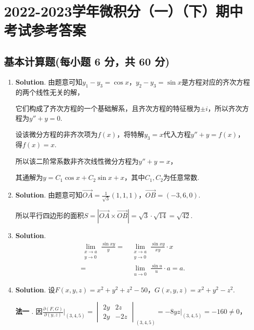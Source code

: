 \documentclass[../main.tex]{subfiles}
\begin{document}
\chapter{2022-2023学年微积分（一）（下）期中考试参考答案}
\section{基本计算题(每小题 6 分，共 60 分)}
\begin{enumerate}
    \item \textbf{Solution}. 由题意可知$y_{1}-y_{3}=\cos x$，$y_{2}-y_{3}=\sin x$是方程对应的齐次方程的两个线性无关的解，

          它们构成了齐次方程的一个基础解系，且齐次方程的特征根为$\pm i$，所以齐次方程为$y
              ''+y=0$.

          设该微分方程的非齐次项为$f(x)$，将特解$y_{3} = x$代入方程$y''+y=f(x)$，得$f
              (x)=x$.

          所以该二阶常系数非齐次线性微分方程为$y''+y=x$，

          其通解为$y = C_{1}\cos x + C_{2}\sin x + x$，其中$C_{1},C_{2}$为任意常数.

    \item \textbf{Solution}. 由题意可知$\overrightarrow{OA}=\frac{1}{\sqrt{3}}(1,
              1,1)$，$\overrightarrow{OB}=(-3,6,0)$.

          所以平行四边形的面积$S=\left|\overrightarrow{OA}\times \overrightarrow{OB}\right
              |=\sqrt{3}\cdot\sqrt{14}=\sqrt{42}$.

    \item \textbf{Solution}.
          \[
              \begin{aligned}
                  \lim_{\substack{x\to a \\ y\to 0}}\frac{\sin xy}{y}= {} & \lim_{\substack{x\to a \\ y\to 0}}\frac{\sin xy}{xy}\cdot x \\
                  = {}                                                    & \lim_{\substack{u\to 0}}\frac{\sin u}{u}\cdot a = a.
              \end{aligned}
          \]

    \item \textbf{Solution}. 设$F(x,y,z) = x^{2}+y^{2}+z^{2}-50$，$G(x,y,z)=x^{2}
              +y^{2}-z^{2}$.

          \textbf{法一} . 因$\frac{\partial (F,G)}{\partial (y,z)}\bigg|_{(3,4,5)}=
              \begin{vmatrix}
                  2y & 2z  \\
                  2y & -2z
              \end{vmatrix}_{(3,4,5)}=\left.-8yz\right|_{(3,4,5)}=-160\neq 0$，


\end{enumerate}
\end{document}
